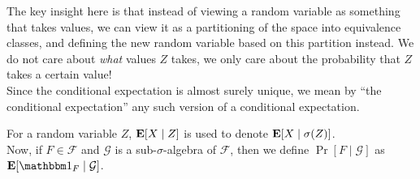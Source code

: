 The key insight here is that instead of viewing a random variable as something that takes values, we can view it as a partitioning of the space into equivalence classes, and defining the new random variable based on this partition instead. We do not care about \textit{what} values $Z$ takes, we only care about the probability that $Z$ takes a certain value!\\
Since the conditional expectation is almost surely unique, we mean by ``the conditional expectation'' any such version of a conditional expectation. 

For a random variable $Z$, $\textbf{E}[X\mid Z]$ is used to denote $\textbf{E}[X\mid\sigma(Z)]$.\\

Now, if $F\in\mathcal{F}$ and $\mathcal{G}$ is a sub-$\sigma$-algebra of $\mathcal{F}$, then we define $\Pr[F\mid\mathcal{G}]$ as $\expec[\indic_F\mid\mathcal{G}]$.



